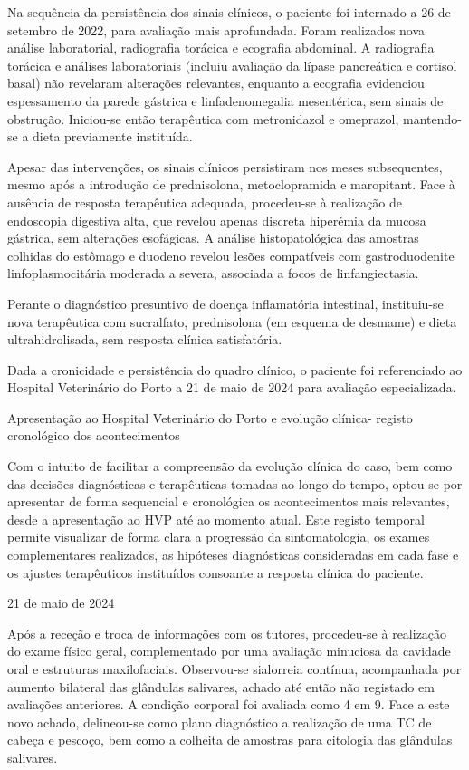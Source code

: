 Na sequência da persistência dos sinais clínicos, o paciente foi internado a 26 de setembro de 2022, para avaliação mais aprofundada. Foram realizados nova análise laboratorial, radiografia torácica e ecografia abdominal. A radiografia torácica e análises laboratoriais (incluiu avaliação da lípase pancreática e cortisol basal) não revelaram alterações relevantes, enquanto a ecografia evidenciou espessamento da parede gástrica e linfadenomegalia mesentérica, sem sinais de obstrução. Iniciou-se então terapêutica com metronidazol e omeprazol, mantendo-se a dieta previamente instituída.


Apesar das intervenções, os sinais clínicos persistiram nos meses subsequentes, mesmo após a introdução de prednisolona, metoclopramida e maropitant. Face à ausência de resposta terapêutica adequada, procedeu-se à realização de endoscopia digestiva alta, que revelou apenas discreta hiperémia da mucosa gástrica, sem alterações esofágicas.  A análise histopatológica das amostras colhidas do estômago e duodeno revelou lesões compatíveis com gastroduodenite linfoplasmocitária moderada a severa, associada a focos de linfangiectasia. 


Perante o diagnóstico presuntivo de doença inflamatória intestinal, instituiu-se nova terapêutica com sucralfato, prednisolona (em esquema de desmame) e dieta ultrahidrolisada, sem resposta clínica satisfatória.


Dada a cronicidade e persistência do quadro clínico, o paciente foi referenciado ao Hospital Veterinário do Porto a 21 de maio de 2024 para avaliação especializada.


Apresentação ao Hospital Veterinário do Porto e evolução clínica- registo cronológico dos acontecimentos


Com o intuito de facilitar a compreensão da evolução clínica do caso, bem como das decisões diagnósticas e terapêuticas tomadas ao longo do tempo, optou-se por apresentar de forma sequencial e cronológica os acontecimentos mais relevantes, desde a apresentação ao HVP até ao momento atual. Este registo temporal permite visualizar de forma clara a progressão da sintomatologia, os exames complementares realizados, as hipóteses diagnósticas consideradas em cada fase e os ajustes terapêuticos instituídos consoante a resposta clínica do paciente.

21 de maio de 2024


Após a receção e troca de informações com os tutores, procedeu-se à realização do exame físico geral, complementado por uma avaliação minuciosa da cavidade oral e estruturas maxilofaciais. Observou-se sialorreia contínua, acompanhada por aumento bilateral das glândulas salivares, achado até então não registado em avaliações anteriores. A condição corporal foi avaliada como 4 em 9. 
Face a este novo achado, delineou-se como plano diagnóstico a realização de uma TC de cabeça e pescoço, bem como a colheita de amostras para citologia das glândulas salivares.


